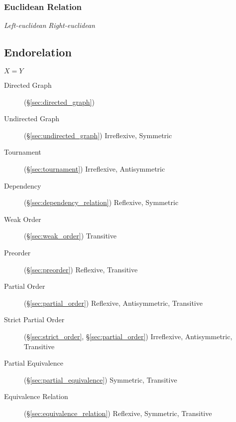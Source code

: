 \subsubsection{Euclidean Relation}\label{sec:euclidean_relation}

\emph{Left-euclidean} \emph{Right-euclidean}



\subsection{Endorelation}\label{sec:endorelation}

$X = Y$

\begin{description}
\item [Directed Graph] (\S\ref{sec:directed_graph})

\item [Undirected Graph] (\S\ref{sec:undirected_graph}) Irreflexive,
  Symmetric

\item [Tournament] (\S\ref{sec:tournament}) Irreflexive, Antisymmetric

\item [Dependency] (\S\ref{sec:dependency_relation}) Reflexive,
  Symmetric

\item [Weak Order] (\S\ref{sec:weak_order}) Transitive

\item [Preorder] (\S\ref{sec:preorder}) Reflexive, Transitive

\item [Partial Order] (\S\ref{sec:partial_order}) Reflexive,
  Antisymmetric, Transitive

\item [Strict Partial Order] (\S\ref{sec:strict_order},
  \S\ref{sec:partial_order}) Irreflexive, Antisymmetric, Transitive

\item [Partial Equivalence] (\S\ref{sec:partial_equivalence})
  Symmetric, Transitive

\item [Equivalence Relation] (\S\ref{sec:equivalence_relation})
  Reflexive, Symmetric, Transitive

\end{description}


